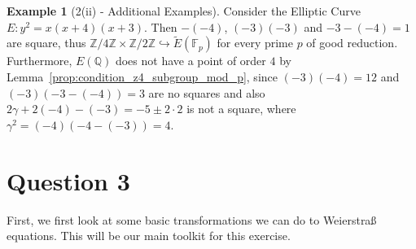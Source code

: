 \documentclass{scrartcl}
\newcommand{\Z}{\mathbb{Z}}
\newcommand{\F}{\mathbb{F}}
\newcommand{\Q}{\mathbb{Q}}
\theoremstyle{definition}
\newtheorem{example}[subsection]{Example}
\begin{document}
\begin{example}[2(ii) - Additional Examples]
    Consider the Elliptic Curve $E: y^2 = x(x + 4)(x + 3)$.
    Then $-(-4)$, $(-3)(-3)$ and $-3 - (-4) = 1$ are square, thus $\Z/4\Z \times \Z/2\Z \hookrightarrow \tilde{E}(\F_p)$ for every prime $p$ of good reduction.
    Furthermore, $E(\Q)$ does not have a point of order $4$ by Lemma~\ref{prop:condition_z4_subgroup_mod_p}, since $(-3)(-4) = 12$ and $(-3)(-3 - (-4)) = 3$ are no squares and also $2\gamma + 2(-4) - (-3) = -5 \pm 2 \cdot 2$ is not a square, where $\gamma^2 = (-4)(-4 - (-3)) = 4$.
\end{example}

\section{Question 3}
First, we first look at some basic transformations we can do to Weierstraß equations.
This will be our main toolkit for this exercise.
\end{document}
